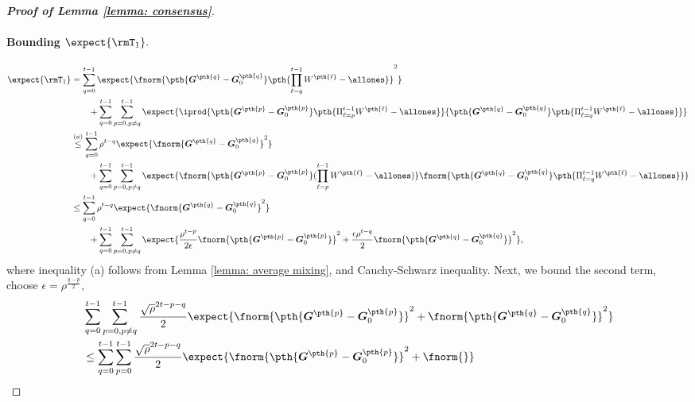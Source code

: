 \documentclass[letterpaper, 10 pt, conference]{ieeeconf}  %
\begin{document}
\begin{proof}[\bf Proof of Lemma \ref{lemma: consensus}]
\paragraph{Bounding $\expect{\rmT_1}.$}
\begin{align}
\label{eq: conseneus iterative error 1}
\nonumber
    \expect{\rmT_1 } &= \sum_{q=0}^{t-1} \expect{\fnorm{ 
    \pth{
    \bm{G}^{\pth{q}} - \bm{G}_0^{\pth{q}}
    }
    \pth{\prod_{\ell=q}^{t-1} W^{\pth{\ell}} - \allones}
    }^2 } \\
    \nonumber
     &\qquad + \sum_{q=0}^{t-1} \sum_{p=0, p\neq q}^{t-1} \expect{\iprod{\pth{\bm{G}^{\pth{p}} - \bm{G}_0^{\pth{p}}} \pth{\Pi_{\ell=p}^{t-1}W^{\pth{\ell}} - \allones}}{\pth{
    \bm{G}^{\pth{q}} - \bm{G}_0^{\pth{q}}
    }
    \pth{\Pi_{\ell=q}^{t-1} W^{\pth{\ell}} - \allones}
    } }\\
    \nonumber
    &\overset{(a)}{\le} \sum_{q=0}^{t-1} \rho^{t-q}\expect{\fnorm{\bm{G}^{\pth{q}} - \bm{G}_0^{\pth{q}}}^2 } \\
    \nonumber
    &\qquad  + \sum_{q=0}^{t-1} \sum_{p=0, p\neq q}^{t-1}\expect{ 
    \fnorm{\pth{
    \bm{G}^{\pth{p}} - \bm{G}_0^{\pth{p}}
    }
    (\prod_{\ell=p}^{t-1} W^{\pth{\ell}} - \allones)}
    \fnorm{
    \pth{
    \bm{G}^{\pth{q}} - \bm{G}_0^{\pth{q}}
    }
    \pth{\Pi_{\ell=q}^{t-1} W^{\pth{\ell}} - \allones}
    } }\\
    \nonumber
    &\le \sum_{q=0}^{t-1} \rho^{t-q}\expect{\fnorm{\bm{G}^{\pth{q}} - \bm{G}_0^{\pth{q}}}^2 } \\
    & \qquad     + \sum_{q=0}^{t-1} \sum_{p=0, p\neq q}^{t-1} \expect{
    {
    \frac{\rho^{t-p}}{2\epsilon}
    \fnorm{\pth{
    \bm{G}^{\pth{p}} - \bm{G}_0^{\pth{p}}
    }}^2 
    +
    \frac{\epsilon \rho^{t-q}}{2}
    \fnorm{
    \pth{
    \bm{G}^{\pth{q}} - \bm{G}_0^{\pth{q}}
    }}^2 } }, 
\end{align}
where inequality (a) follows from Lemma \ref{lemma: average mixing}, and Cauchy-Schwarz inequality. 
Next, we bound the second term, choose $\epsilon = \rho^{\frac{q-p}{2}},$
\begin{align*}
    &\sum_{q=0}^{t-1} \sum_{p=0, p\neq q}^{t-1}  \frac{\sqrt{\rho}^{2t-p-q}}{2}\expect{
    {
    \fnorm{\pth{
    \bm{G}^{\pth{p}} - \bm{G}_0^{\pth{p}}
    }}^2 
    +
    \fnorm{
    \pth{
    \bm{G}^{\pth{q}} - \bm{G}_0^{\pth{q}}
    }}^2 } } \\ 
    & \le \sum_{q=0}^{t-1} \sum_{p=0}^{t-1} \frac{\sqrt{\rho}^{2t-p-q}}{2}\expect{
    {
    \fnorm{\pth{
    \bm{G}^{\pth{p}} - \bm{G}_0^{\pth{p}}
    }}^2 
    +
    \fnorm{
}}}
\end{align*}
\end{proof}
\end{document}
